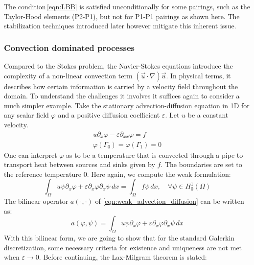 The condition\,\eqref{eqn:LBB} is satisfied unconditionally for some pairings, such as the Taylor-Hood elements (P2-P1), but not for P1-P1 pairings as shown here. The stabilization techniques introduced later however mitigate this inherent issue.

\subsubsection*{Convection dominated processes}
Compared to the Stokes problem, the Navier-Stokes equations introduce the complexity of a non-linear convection term $(\vec{u}\cdot\nabla)\vec{u}$. In physical terms, it describes how certain information is carried by a velocity field throughout the domain. To understand the challenges it involves it suffices again to consider a much simpler example. Take the stationary advection-diffusion equation in 1D for any scalar field $\varphi$ and a positive diffusion coefficient $\varepsilon$. Let $u$ be a constant velocity.
\begin{equation}
	\begin{split}
		u \partial_x \varphi - \varepsilon\partial_{xx}\varphi= f\\
		\varphi(\Gamma_0) = \varphi(\Gamma_1) = 0
	\end{split}
	\label{eqn:advection_diffusion}
\end{equation}
One can interpret $\varphi$ as to be a temperature that is convected through a pipe to transport heat between sources and sinks given by $f$. The boundaries are set to the reference temperature $0$. Here again, we compute the weak formulation:
\begin{equation}
	\int_{\Omega} u\psi\partial_x\varphi + \varepsilon\partial_x\varphi\partial_x\psi\,dx = \int_{\Omega} f\psi\,dx, \quad \forall \psi\in H^1_0(\Omega)
	\label{eqn:weak_advection_diffusion}
\end{equation}
The bilinear operator $a(\cdot,\cdot)$ of \autoref{eqn:weak_advection_diffusion} can be written as:
\begin{equation}
	a(\varphi, \psi) = \int_{\Omega} u\psi\partial_x\varphi + \varepsilon\partial_x\varphi\partial_x\psi\,dx
	\label{eqn:bilinear_advection_diffusion}
\end{equation}
With this bilinear form, we are going to show that for the standard Galerkin discretization, some necessary criteria for existence and uniqueness are not met when $\varepsilon\rightarrow0$. Before continuing, the Lax-Milgram theorem is stated:

